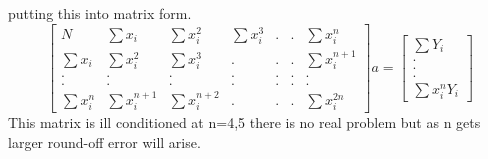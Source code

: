 putting this into matrix form.
\begin{equation}\left[
\begin{array}{ccccccc}
N&\sum x_i & \sum x_i^2 & \sum x_i^3 &.&.& \sum x^n_i\\
\sum x_i & \sum x_i^2 & \sum x_i^3 &.&.& .&\sum x^{n+1}_i\\
.&.& .&.& .&.& .\\
.&.& .&.& .&.& .\\
\sum x_i^n & \sum x_i^{n+1} & \sum x_i^{n+2} &.&.& .&\sum x^{2n}_i
\end{array}\right]
a = 
\left[
\begin{array}{c}\sum Y_i\\
.\\
.\\
.\\
\sum x_i^nY_i\end{array}\right]
\end{equation}
This matrix is ill conditioned at n=4,5 there is no real problem but as n gets larger
round-off error will arise.
